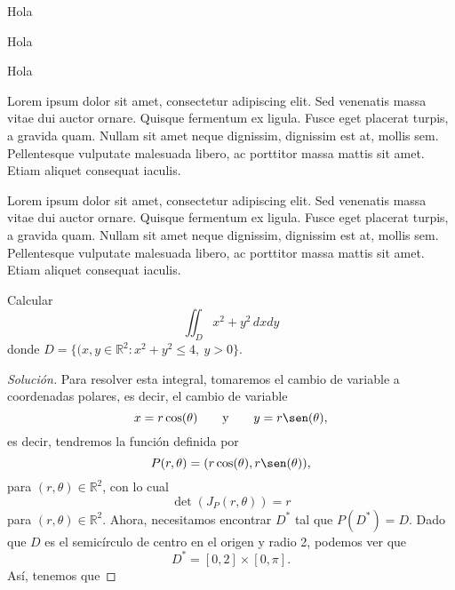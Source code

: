 \documentclass[a4]{aleph-notas-test}
\begin{document}
\begin{cor}
    Hola
\end{cor}

\begin{cor}[Título]
    Hola
\end{cor}

\begin{lem}
    Hola
\end{lem}

\begin{obs}
    Lorem ipsum dolor sit amet, consectetur adipiscing elit. Sed venenatis massa vitae dui auctor ornare. Quisque fermentum ex ligula. Fusce eget placerat turpis, a gravida quam. Nullam sit amet neque dignissim, dignissim est at, mollis sem. Pellentesque vulputate malesuada libero, ac porttitor massa mattis sit amet. Etiam aliquet consequat iaculis.
\end{obs}

\begin{ejem}
    Lorem ipsum dolor sit amet, consectetur adipiscing elit. Sed venenatis massa vitae dui auctor ornare. Quisque fermentum ex ligula. Fusce eget placerat turpis, a gravida quam. Nullam sit amet neque dignissim, dignissim est at, mollis sem. Pellentesque vulputate malesuada libero, ac porttitor massa mattis sit amet. Etiam aliquet consequat iaculis.
\end{ejem}

\begin{ejer}
    Calcular \[\iint_D x^2+y^2\,dxdy\] donde $D=\{(x,y\in\mathbb{R}^2:x^2+y^2\leq 4,\ y>0\}$.
\end{ejer}

\begin{proof}[Solución]
    Para resolver esta integral, tomaremos el cambio de variable a coordenadas polares, es decir, el cambio de variable
    \[
        x=r\cos(\theta)
        \texty
        y=r\sen(\theta),
    \]
    es decir, tendremos la función definida por
    \[
        P(r,\theta) = (r\cos(\theta) , r\sen(\theta)),
    \]
    para $(r,\theta)\in\mathbb{R}^2$, con lo cual
    \[
        \det(J_P(r,\theta)) = r
    \]
    para $(r,\theta)\in\mathbb{R}^2$. Ahora, necesitamos encontrar $D^*$ tal que $P(D^*)=D$. Dado que $D$ es el semicírculo de centro en el origen y radio 2, podemos ver que
    \[
        D^*=[0,2]\times [0,\pi].
    \]
    Así, tenemos que
\end{proof}
\end{document}
